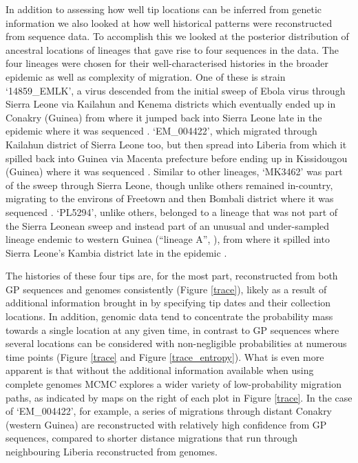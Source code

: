 \documentclass[11pt,oneside,letterpaper]{article}
\begin{document}
In addition to assessing how well tip locations can be inferred from genetic information we also looked at how well historical patterns were reconstructed from sequence data.
To accomplish this we looked at the posterior distribution of ancestral locations of lineages that gave rise to four sequences in the data.
The four lineages were chosen for their well-characterised histories in the broader epidemic as well as complexity of migration.
One of these is strain `14859\_EMLK', a virus descended from the initial sweep of Ebola virus through Sierra Leone via Kailahun and Kenema districts which eventually ended up in Conakry (Guinea) from where it jumped back into Sierra Leone late in the epidemic where it was sequenced \citep{arias_rapid_2016}.
`EM\_004422', which migrated through Kailahun district of Sierra Leone too, but then spread into Liberia from which it spilled back into Guinea via Macenta prefecture before ending up in Kissidougou (Guinea) where it was sequenced \citep{carroll_temporal_2015}.
Similar to other lineages, `MK3462' was part of the sweep through Sierra Leone, though unlike others remained in-country, migrating to the environs of Freetown and then Bombali district where it was sequenced \citep{arias_rapid_2016}.
`PL5294', unlike others, belonged to a lineage that was not part of the Sierra Leonean sweep and instead part of an unusual and under-sampled lineage endemic to western Guinea (``lineage A'', \citep{carroll_temporal_2015}), from where it spilled into Sierra Leone's Kambia district late in the epidemic \citep{arias_rapid_2016}.

The histories of these four tips are, for the most part, reconstructed from both GP sequences and genomes consistently (Figure \ref{trace}), likely as a result of additional information brought in by specifying tip dates and their collection locations.
In addition, genomic data tend to concentrate the probability mass towards a single location at any given time, in contrast to GP sequences where several locations can be considered with non-negligible probabilities at numerous time points (Figure \ref{trace} and Figure \ref{trace_entropy}).
What is even more apparent is that without the additional information available when using complete genomes MCMC explores a wider variety of low-probability migration paths, as indicated by maps on the right of each plot in Figure \ref{trace}.
In the case of `EM\_004422', for example, a series of migrations through distant Conakry (western Guinea) are reconstructed with relatively high confidence from GP sequences, compared to shorter distance migrations that run through neighbouring Liberia reconstructed from genomes.
\end{document}
